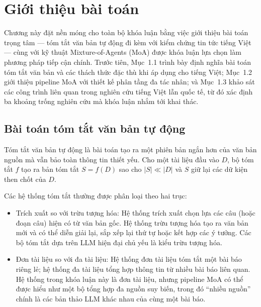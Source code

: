 \chapter{Giới thiệu bài toán}

Chương này đặt nền móng cho toàn bộ khóa luận bằng việc giới thiệu bài toán trọng tâm --- tóm tắt văn bản tự động đi kèm với kiểm chứng tin tức tiếng Việt
 --- cùng với kỹ thuật Mixture-of-Agents (MoA) được khóa luận lựa chọn làm phương pháp tiếp cận chính. 
 Trước tiên, Mục~1.1 trình bày định nghĩa bài toán tóm tắt văn bản và các thách thức đặc thù khi áp dụng cho tiếng Việt; 
 Mục~1.2 giới thiệu pipeline MoA với thiết kế phân tầng đa tác nhân; 
 và Mục~1.3 khảo sát các công trình liên quan trong nghiên cứu tiếng Việt lẫn quốc tế, 
 từ đó xác định ba khoảng trống nghiên cứu mà khóa luận nhắm tới khai thác.

\section{Bài toán tóm tắt văn bản tự động}

Tóm tắt văn bản tự động là bài toán tạo ra một phiên bản ngắn hơn
của văn bản nguồn mà vẫn bảo toàn thông tin thiết yếu. Cho một tài
liệu đầu vào $D$, bộ tóm tắt $f$ tạo ra bản tóm tắt $S = f(D)$
sao cho $|S| \ll |D|$ và $S$ giữ lại các dữ kiện then chốt của $D$.

Các hệ thống tóm tắt thường được phân loại theo hai trục:

\begin{itemize}
  \item {Trích xuất so với trừu tượng hóa:}
        Hệ thống trích xuất chọn lựa các câu (hoặc đoạn câu) hiện có
        từ văn bản gốc. Hệ thống trừu tượng hóa tạo ra văn bản mới
        và có thể diễn giải lại, sắp xếp lại thứ tự hoặc kết hợp
        các ý tưởng. Các bộ tóm tắt dựa trên LLM hiện đại chủ yếu
        là kiểu trừu tượng hóa.
  \item {Đơn tài liệu so với đa tài liệu:}
        Hệ thống đơn tài liệu tóm tắt một bài báo riêng lẻ; hệ thống
        đa tài liệu tổng hợp thông tin từ nhiều bài báo liên quan. Hệ
        thống trong khóa luận này là đơn tài liệu, nhưng pipeline MoA
        có thể được hiểu như một bộ tổng hợp đa nguồn suy biến, trong
        đó ``nhiều nguồn'' chính là các bản thảo LLM khác nhau của cùng
        một bài báo.
\end{itemize}


